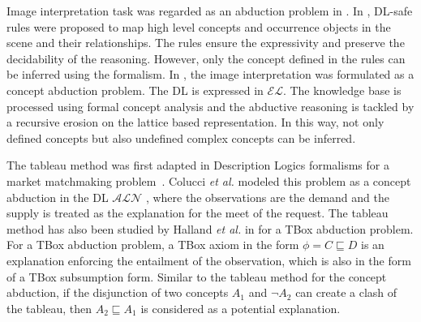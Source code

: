 \documentclass{article}
\begin{document}

Image interpretation task was regarded as an abduction problem in \cite{atif2014explanatory,gries2010probabilistic,neumann2008scene,shanahan2005perception}.
In \cite{neumann2008scene}, DL-safe rules were proposed to map high level concepts and occurrence objects in the scene and their relationships.
The rules ensure the expressivity and preserve the decidability of the reasoning. However, only the concept defined in the rules can be inferred using 
the formalism. In \cite{atif2014explanatory}, the image interpretation was formulated as a concept abduction problem.
The DL is expressed in $\mathcal{EL}$. The knowledge base is processed using formal concept analysis and the abductive reasoning is tackled
by a recursive erosion on the lattice based representation. In this way, not only defined concepts but also undefined complex concepts can be inferred.


The tableau method was first adapted in Description Logics formalisms for a market matchmaking problem~\cite{colucci2004uniform}.
Colucci \textit{et al.} modeled this problem as a concept abduction in the DL $\mathcal{ALN}$ \cite{colucci2004uniform},
where the observations are the demand and the supply is treated as the explanation for the meet of the request.
The tableau method has also been studied by Halland \textit{et al.} in \cite{halland2014tbox} for a TBox abduction problem.
For a TBox abduction problem, a TBox axiom in the form $\phi= C\sqsubseteq D$ is an explanation enforcing the entailment of the observation,
which is also in the form of  a TBox subsumption form. Similar to the tableau method for the  concept abduction, if the disjunction of
two concepts $A_1$  and $\neg A_2$ can create a clash of the tableau, then $A_2 \sqsubseteq A_1$ is considered as a potential explanation.
\end{document}
